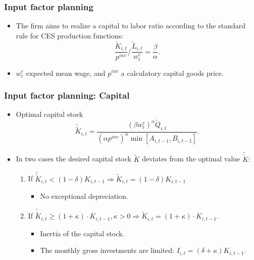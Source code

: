 \documentclass{beamer}
\begin{document}
\frame
{

  \frametitle{Input factor planning} 
\begin{itemize}
	\item The firm aims to realize a capital to labor ratio according to the standard rule for CES production functions: 
		\[
	\frac{\tilde K_{i,t}}{p^{inv}} / \frac{\tilde L_{i,t}}{w_t^e} =\frac{\beta}{\alpha}.
	\]
	\item $w_t^e$ expected mean wage, and $p^{inv}$ a calculatory capital goods price.

	
	
	
\end{itemize}

}


\frame
{

  \frametitle{Input factor planning: Capital} 
\begin{itemize}

\item Optimal capital stock 
\[
\tilde {\tilde K}_{i,t}= \frac{(\beta w_t^e)^{\alpha} \tilde
Q_{i,t}}{(\alpha p^{inv})^{\alpha} \min [A_{i,t-1}, B_{i,t-1}]}.
\]

\item In two cases the desired capital stock $\tilde{K}$ deviates from the optimal value $\tilde {\tilde K}:$ 

 
\begin{enumerate}
	\item If $\tilde {\tilde K}_{i,t} < (1- \delta) K_{i,t-1} \Rightarrow \tilde{K}_{i,t}= (1- \delta) K_{i,t-1}$
\begin{itemize}
	\item  No exceptional depreciation.
\end{itemize}
	
	\item If $\tilde {\tilde K}_{i,t} \geq (1+\kappa) \cdot K_{i,t-1}, \kappa > 0 \Rightarrow  {\tilde K}_{i,t} = (1+\kappa)  \cdot K_{i,t-1}$.
	
	
\begin{itemize}
	\item Inertia of the capital stock.
	\item The monthly gross investments are limited: $I_{i,t}= (\delta + \kappa)K_{i,t-1}$.
\end{itemize}	
	 
\end{enumerate}

 
	
\end{itemize}

}
\end{document}
